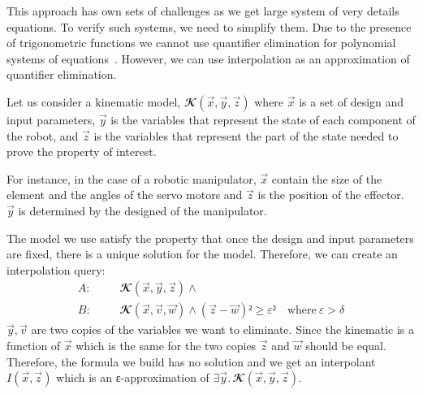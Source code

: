 This approach has own sets of challenges as we get large system of very details equations.
To verify such systems, we need to simplify them.
Due to the presence of trigonometric functions we cannot use quantifier elimination for polynomial systems of equations~\cite{qepcad}.
However, we can use interpolation as an approximation of quantifier elimination.

Let us consider a kinematic model, $𝓚(\vec x,\vec y,\vec z)$ where $\vec x$ is a set of design and input parameters, $\vec y$ is the variables that represent the state of each component of the robot, and $\vec z$ is the variables that represent the part of the state needed to prove the property of interest.

For instance, in the case of a robotic manipulator, $\vec x$ contain the size of the element and the angles of the servo motors and $\vec z$ is the position of the effector.
$\vec y$ is determined by the designed of the manipulator.

The model we use satisfy the property that once the design and input parameters are fixed, there is a unique solution for the model.
Therefore, we can create an interpolation query:
\begin{eqnarray*}
A: &~~~~ &  𝓚(\vec x,\vec y,\vec z) ∧ \\
B: &~~~~ &  𝓚(\vec x,\vec v,\vec w) ∧ (\vec z-\vec w)² ≥ ε² \quad \text{where} ~ ε > δ
\end{eqnarray*}
$\vec y, \vec v$ are two copies of the variables we want to eliminate.
Since the kinematic is a function of $\vec x$ which is the same for the two copies $\vec z$ and $\vec w$ should be equal.
Therefore, the formula we build has no solution and we get an interpolant $I(\vec x,\vec z)$ which is an ε-approximation of $∃ \vec y.\,𝓚(\vec x,\vec y,\vec z)$.

